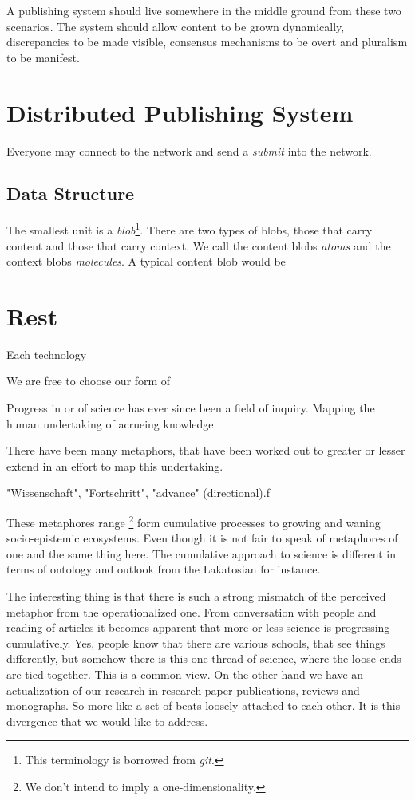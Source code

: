 \documentclass[14pt]{article}
\begin{document}
A publishing system should live somewhere in the middle ground from these two scenarios. The system should allow content to be grown dynamically, discrepancies to be made visible, consensus mechanisms to be overt and pluralism to be manifest. %

\section{Distributed Publishing System}
Everyone may connect to the network and send a \textit{submit} into the network.

\subsection{Data Structure}

The smallest unit is a \textit{blob}\footnote{This terminology is borrowed from \textit{git}.}. There are two types of blobs, those that carry content and those that carry context. We call the content blobs \textit{atoms} and the context blobs \textit{molecules}. A typical content blob would be 



\section{Rest}

Each technology 


We are free to choose our form of 

Progress in or of science has ever since been a field of inquiry.
Mapping the human undertaking of acrueing knowledge 

There have been many metaphors, that have been worked out to greater or lesser extend in an effort to map this undertaking. 

"Wissenschaft", "Fortschritt", "advance" (directional).f

These metaphores range \footnote{We don't intend to imply a one-dimensionality.} form cumulative processes to growing and waning socio-epistemic ecosystems. Even though it is not fair to speak of metaphores of one and the same thing here. The cumulative approach to science is different in terms of ontology and outlook from the Lakatosian for instance. 

The interesting thing is that there is such a strong mismatch of the perceived metaphor from the operationalized one. From conversation with people and reading of articles it becomes apparent that more or less science is progressing cumulatively. Yes, people know that there are various schools, that see things differently, but somehow there is this one thread of science, where the loose ends are tied together. This is a common view. On the other hand we have an actualization of our research in research paper publications, reviews and monographs. So more like a set of beats loosely attached to each other.
It is this divergence that we would like to address.
\end{document}
